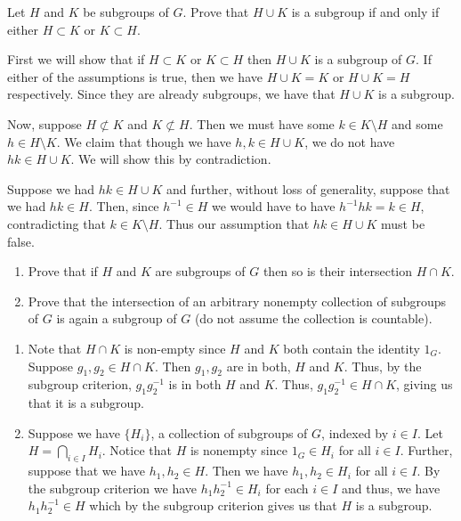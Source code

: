 \documentclass[12 pt, letterpaper]{hmcpset}
\begin{document}
\pagebreak

\begin{problem}
	Let $H$ and $K$ be subgroups of $G$. Prove that $H \cup K$ is a subgroup if and only if either $H \subset K$ or $K \subset H$.
\end{problem}

\begin{solution}
	First we will show that if $H \subset K$ or $K \subset H$  then $H \cup K$ is a subgroup of $G$. If either of the assumptions is true, then we have $H \cup K = K$ or $H \cup K = H$ respectively. Since they are already subgroups, we have that $H \cup K$ is a subgroup. 

	Now, suppose $H \not \subset K$ and $K \not \subset H$. Then we must have some $k \in K \setminus H$ and some $h \in H \setminus K$. We claim that though we have $h, k \in H \cup K$, we do not have $hk \in H \cup K$. We will show this by contradiction. 

	Suppose we had $hk \in H \cup K$ and further, without loss of generality, suppose that we had $hk \in H$. Then, since $h^{-1} \in H$ we would have to have $h^{-1}hk = k \in H$, contradicting that $k \in K \setminus H$. Thus our assumption that $hk \in H \cup K$ must be false.
\end{solution}

\pagebreak

\begin{problem}
	\begin{enumerate}
		\item Prove that if $H$ and $K$ are subgroups of $G$ then so is their intersection $H \cap K$.
		\item Prove that the intersection of an arbitrary nonempty collection of subgroups of $G$ is again a subgroup of $G$ (do not assume the collection is countable).
	\end{enumerate}
\end{problem}

\begin{solution}
	\begin{enumerate}
		\item Note that $H \cap K$ is non-empty since $H$ and $K$ both contain the identity $1_G$. Suppose $g_1, g_2 \in H \cap K$. Then $g_1, g_2$ are in both, $H$ and $K$. Thus, by the subgroup criterion, $g_1 g_2^{-1}$ is in both $H$ and $K$. Thus, $g_1 g_2^{-1} \in H \cap K$, giving us that it is a subgroup.
		\item Suppose we have $\{ H_i \}$, a collection of subgroups of $G$, indexed by $i \in I$. Let $H = \bigcap_{i \in I} H_i$. Notice that $H$ is nonempty since $1_G \in H_i$ for all $i \in I$. Further, suppose that we have $h_1, h_2 \in H$. Then we have $h_1, h_2 \in H_i$ for all $i \in I$. By the subgroup criterion we have $h_1 h_2^{-1} \in H_i$ for each $i \in I$ and thus, we have $h_1 h_2^{-1} \in H$ which by the subgroup criterion gives us that $H$ is a subgroup.
	\end{enumerate}
\end{solution}
\end{document}
